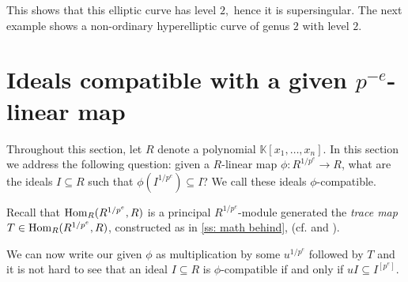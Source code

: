 \documentclass{amsart}
\renewcommand{\leq}{\leqslant}
\begin{document}
\medskip
{\small
{}
}\medskip

This shows that this elliptic curve has level $2,$ hence it is supersingular. The next example
shows a non-ordinary hyperelliptic curve of genus $2$ with level $2$.

\medskip
{\small
{}
}\medskip

\section{Ideals compatible with a given $p^{-e}$-linear map}\label{Section: compatible ideals}

Throughout this section, let $R$ denote a polynomial $\mathbb{K}[x_1, \dots, x_n]$.
In this section we address the following question:
given a $R$-linear map $\phi: R^{1/p^e} \rightarrow R$, what are the ideals $I\subseteq R$ such that $\phi(I^{1/p^e})\subseteq I$?
We call these ideals $\phi$-compatible.

Recall that  $\operatorname{Hom}_R( R^{1/p^e}, R)$  is a principal $R^{1/p^e}$-module generated
the \emph{trace map} $T\in \operatorname{Hom}_R(R^{1/p^e}, R)$, constructed as in \autoref{ss: math behind}, (cf. \cite[Lemma 1.6]{FedderFPureRat} and \cite[Example 1.3.1]{BrionKumarFrobeniusSplitting}).
%
%

We can now write our given $\phi$ as multiplication by some $u^{1/p^e}$ followed by $T$ and it is not hard to see that
an ideal $I\subseteq R$ is $\phi$-compatible if and only if $u I \subseteq I^{[p^e]}$.
\end{document}
